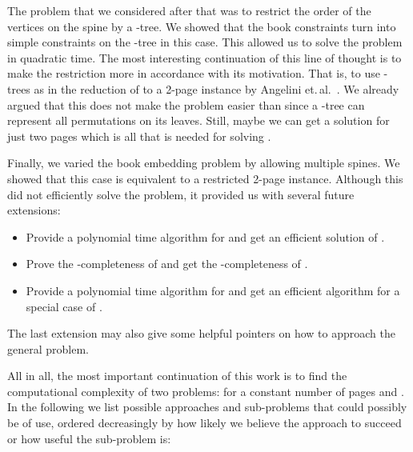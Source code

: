 The problem that we considered after that was to restrict the order of the vertices on the spine
by a \Q-tree. We showed that the book constraints turn into simple constraints
on the \Q-tree in this case. This allowed us to solve the problem in quadratic time. The most interesting
continuation of this line of thought is to make the restriction more in accordance with its motivation.
That is, to use \PT-trees as in the reduction of \SEFECON to a 2-page \probPTree instance by Angelini et.\,al.~\cite{angelini11}. We already argued that
this does not make the problem easier than \probBook since a \PT-tree can represent
all permutations on its leaves. Still, maybe we can get a solution for just two pages
which is all that is needed for solving \SEFECON.

Finally, we varied the book embedding problem by allowing multiple spines. We showed
that this case is equivalent to a restricted 2-page \probPTree instance. Although this did not efficiently solve the problem, it provided
us with several future extensions: 
\begin{itemize}
\item Provide a polynomial time algorithm for  \probPTree and get an efficient solution of \probMul.
\item Prove the \NP-completeness of \probMul and get the \NP-completeness of \probPTree.
\item Provide a polynomial time algorithm for \probMul and get an efficient algorithm for a special case of \probPTree.
\end{itemize}
The last
extension may also give some
helpful pointers on how to approach the general \probPTree problem.

All in all, the most important continuation of this work is to find the computational
complexity of two problems: \probBook for
a constant number of pages and \probPTree. In the following we
list possible approaches and sub-problems that could possibly be of use, ordered decreasingly by how likely
we believe the approach to succeed or how useful the sub-problem is:

